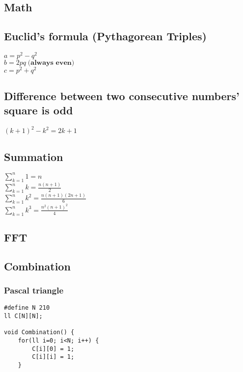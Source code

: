 \documentclass[10pt,oneside]{article}
\begin{document}
\begin{landscape}
\begin{multicols}{2}
\section{Math}

\subsection{Euclid's formula (Pythagorean Triples)}

$a = p^2 - q^2 $\\
$b = 2pq \; \textbf{(always even)}$ \\
$c = p^2 + q^2$\\

\subsection{Difference between two consecutive numbers' square is odd}

$(k + 1)^2 - k^2 = 2k + 1$

\subsection{Summation}

$\sum_{k=1}^{n} 1= n$\\
$\sum_{k=1}^{n} k= \frac{n(n+1)}{2}$\\
$\sum_{k=1}^{n} k^2= \frac{n(n+1)(2n+1)}{6}$\\
$\sum_{k=1}^{n} k^3= \frac{n^2(n+1)^2}{4}$\\

\subsection{FFT}


\subsection{Combination}

\subsubsection{Pascal triangle}

\begin{lstlisting}
#define N 210
ll C[N][N];

void Combination() {
    for(ll i=0; i<N; i++) {
        C[i][0] = 1;
        C[i][i] = 1;
    }


\end{lstlisting}
\end{multicols}
\end{landscape}
\end{document}
